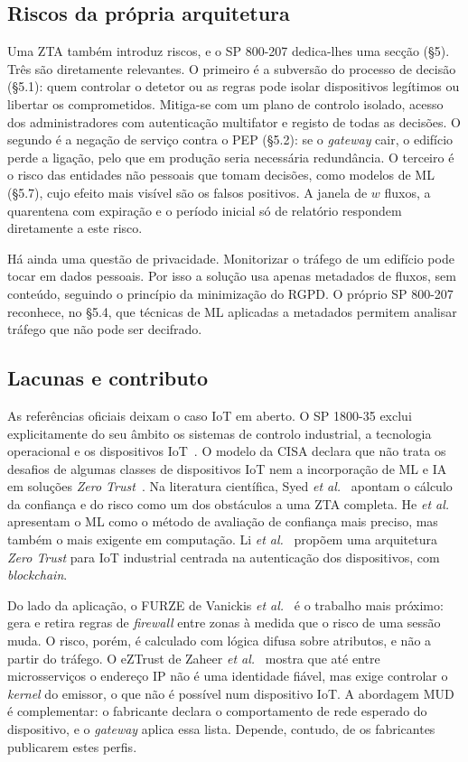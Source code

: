 \documentclass[conference,a4paper]{IEEEtran}
\begin{document}
\subsection{Riscos da própria arquitetura}
Uma ZTA também introduz riscos, e o SP 800-207 dedica-lhes uma secção (§5). Três são
diretamente relevantes. O primeiro é a subversão do processo de decisão (§5.1): quem
controlar o detetor ou as regras pode isolar dispositivos legítimos ou libertar os
comprometidos. Mitiga-se com um plano de controlo isolado, acesso dos
administradores com autenticação multifator e registo de todas as decisões. O segundo é a negação de serviço contra
o PEP (§5.2): se o \textit{gateway} cair, o edifício perde a ligação, pelo que em
produção seria necessária redundância. O terceiro é o risco das entidades não pessoais
que tomam decisões, como modelos de ML (§5.7), cujo efeito mais visível são os falsos
positivos. A janela de $w$ fluxos, a quarentena com expiração e o período inicial só de
relatório respondem diretamente a este risco.

Há ainda uma questão de privacidade. Monitorizar o tráfego de um edifício pode tocar em
dados pessoais. Por isso a solução usa apenas metadados de fluxos, sem conteúdo,
seguindo o princípio da minimização do RGPD. O próprio SP 800-207 reconhece, no §5.4, que
técnicas de ML aplicadas a metadados permitem analisar tráfego que não pode ser
decifrado.

\subsection{Lacunas e contributo}
As referências oficiais deixam o caso IoT em aberto. O SP 1800-35 exclui explicitamente
do seu âmbito os sistemas de controlo industrial, a tecnologia operacional e os
dispositivos IoT~\cite{nccoe2025zta}. O modelo da CISA declara que não trata os desafios
de algumas classes de dispositivos IoT nem a incorporação de ML e IA em soluções
\textit{Zero Trust}~\cite{cisa2023ztmm}. Na literatura científica, Syed
\textit{et al.}~\cite{syed2022zta} apontam o cálculo da confiança e do risco como um dos
obstáculos a uma ZTA completa. He \textit{et al.}~\cite{he2022survey} apresentam o ML
como o método de avaliação de confiança mais preciso, mas também o mais exigente em
computação. Li \textit{et al.}~\cite{li2024iiot} propõem uma arquitetura
\textit{Zero Trust} para IoT industrial centrada na autenticação dos dispositivos, com
\textit{blockchain}.

Do lado da aplicação, o FURZE de Vanickis \textit{et al.}~\cite{vanickis2018access} é o
trabalho mais próximo: gera e retira regras de \textit{firewall} entre zonas à medida que
o risco de uma sessão muda. O risco, porém, é calculado com lógica difusa sobre
atributos, e não a partir do tráfego. O eZTrust de Zaheer \textit{et al.}~\cite{zaheer2019eztrust}
mostra que até entre microsserviços o endereço IP não é uma identidade fiável, mas exige
controlar o \textit{kernel} do emissor, o que não é possível num dispositivo IoT. A
abordagem MUD~\cite{rfc8520,nist2021mud} é complementar: o fabricante declara o
comportamento de rede esperado do dispositivo, e o \textit{gateway} aplica essa lista.
Depende, contudo, de os fabricantes publicarem estes perfis.
\end{document}
